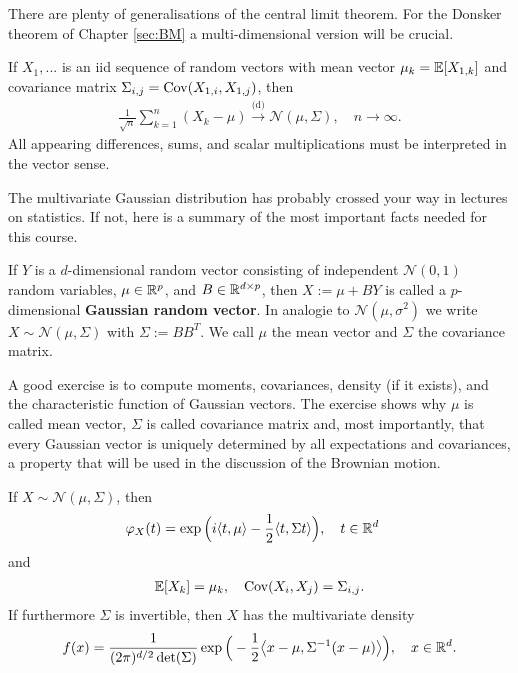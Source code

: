 	There are plenty of generalisations of the central limit theorem. For the Donsker theorem of Chapter \ref{sec:BM} a multi-dimensional version will be crucial. 
	\begin{luebung}
		If $X_1,...$ is an iid sequence of random vectors with mean vector $\mu_k=\mathbb{E}[X_{1,k}]$ and covariance matrix $\Sigma_{i,j}=\operatorname{Cov}(X_{1,i},X_{1,j})$, then
		\begin{align*}
			\frac{1}{\sqrt{n}}\sum_{k=1}^n (X_k-\mu)\overset{\text{(d)}}{\longrightarrow} \mathcal N(\mu,\Sigma),\quad n\to\infty.
		\end{align*}
		All appearing differences, sums, and scalar multiplications must be interpreted in the vector sense.
	\end{luebung}
	The multivariate Gaussian distribution has probably crossed your way in lectures on statistics. If not, here is a summary of the most important facts needed for this course. 
	\begin{ldef}
		\begin{deff}
			If $Y$ is a $d$-dimensional random vector consisting of independent $\mathcal N(0,1)$ random variables, $\mu\in \mathbb{R}^p$, and $B\in \mathbb{R}^{d\times p}$, then $X:=\mu+B Y$ is called a $p$-dimensional \textbf{Gaussian random vector}. In analogie to $\mathcal N(\mu,\sigma^2)$ we write $X\sim \mathcal N(\mu,\Sigma)$ with $\Sigma:=B B^T$. We call $\mu$ the mean vector and $\Sigma$ the covariance matrix.
		\end{deff}
	\end{ldef}
A good exercise is to compute moments, covariances, density (if it exists), and the characteristic function of Gaussian vectors. The exercise shows why $\mu$ is called mean vector, $\Sigma$ is called covariance matrix and, most importantly, that every Gaussian vector is uniquely determined by all expectations and covariances, a property that will be used in the discussion of the Brownian motion.
	\begin{luebung}
	If $X\sim \mathcal N(\mu, \Sigma)$, then 
	\begin{align}\label{CFG}
		\varphi_X(t)&=\exp\Big(i\langle t,\mu\rangle-\frac 1 2 \langle t,\Sigma t\rangle\Big),\quad t\in\mathbb{R}^d
	\end{align}
	and 
	\begin{align*}
		\mathbb{E}[X_k]=\mu_k,\quad 
		\operatorname{Cov}(X_i,X_j)=\Sigma_{i,j}.
	\end{align*}
	If furthermore $\Sigma$ is invertible, then $X$ has the multivariate density 
	\begin{align}\label{NormalDensity}
		f(x)=\frac{1}{(2\pi)^{d/2} \det(\Sigma)} \exp\Big(-\frac{1}{2} \big\langle x-\mu,\Sigma^{-1}(x-\mu) \big\rangle\Big),\quad x\in\mathbb{R}^d.
	\end{align}
\end{luebung}
